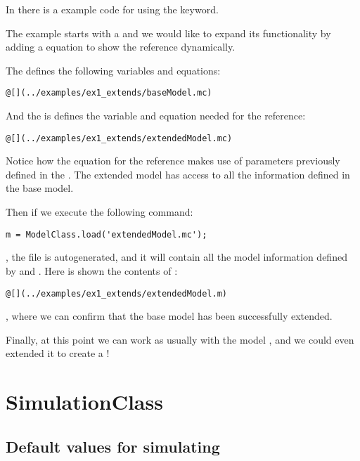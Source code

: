 \documentclass[11pt]{article}
\begin{document}
In  there is a example code for using the  keyword.

The example starts with a  and we would like to expand its functionality by adding a equation to show the reference dynamically.

The  defines the following variables and equations:

\begin{lstlisting}
@[](../examples/ex1_extends/baseModel.mc)
\end{lstlisting}

And the  is defines the variable and equation needed for the reference:

\begin{lstlisting}
@[](../examples/ex1_extends/extendedModel.mc)
\end{lstlisting}

Notice how the equation for the reference  makes use of parameters previously defined in the . The extended model has access to all the information defined in the base model.

Then if we execute the following command:

\begin{lstlisting}
m = ModelClass.load('extendedModel.mc');
\end{lstlisting}

, the file  is autogenerated, and it will contain all the model information defined by  and . Here is shown the contents of :

\begin{lstlisting}
@[](../examples/ex1_extends/extendedModel.m)
\end{lstlisting}

, where we can confirm that the base model has been successfully extended.

Finally, at this point we can work as usually with the model , and we could even extended it to create a !

\section{SimulationClass}

\subsection{Default values for simulating}
\end{document}
